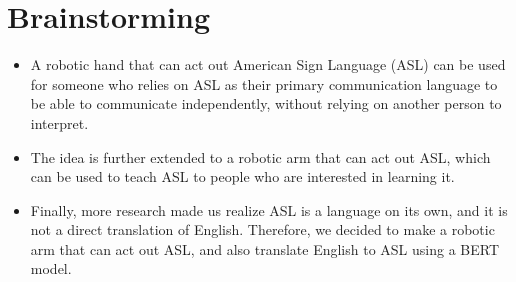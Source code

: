 \part{Brainstorming}

\begin{itemize}
    \item A robotic hand that can act out American Sign Language (ASL) can be used for someone who relies on ASL as their primary communication language to be able to communicate independently, without relying on another person to interpret.
    \item The idea is further extended to a robotic arm that can act out ASL, which can be used to teach ASL to people who are interested in learning it.
    \item Finally, more research made us realize ASL is a language on its own, and it is not a direct translation of English. Therefore, we decided to make a robotic arm that can act out ASL, and also translate English to ASL using a BERT model.
\end{itemize}